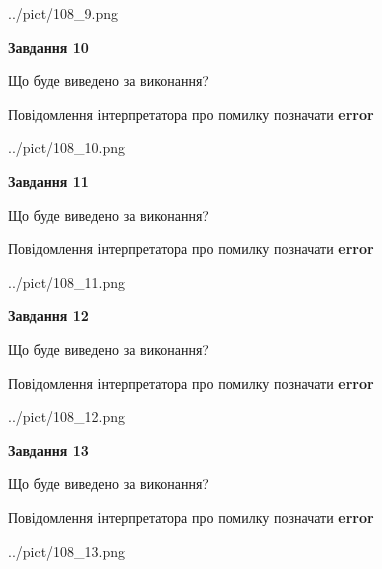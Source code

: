 \documentclass[11pt, ukrainian]{article}
\begin{document}
{\begin {large}
\begin{center}
	{../pict/108_9.png}
\end{center}
\newpage

{\begin {center}\textbf{Завдання 10}\end {center}}\par
Що буде виведено за виконання? \par
Повідомлення інтерпретатора про помилку позначати \textbf{error}

\begin{center}
	{../pict/108_10.png}
\end{center}
\newpage

{\begin {center}\textbf{Завдання 11}\end {center}}\par
Що буде виведено за виконання? \par
Повідомлення інтерпретатора про помилку позначати \textbf{error}

\begin{center}
	{../pict/108_11.png}
\end{center}
\newpage

{\begin {center}\textbf{Завдання 12}\end {center}}\par
Що буде виведено за виконання? \par
Повідомлення інтерпретатора про помилку позначати \textbf{error}

\begin{center}
	{../pict/108_12.png}
\end{center}
\newpage

{\begin {center}\textbf{Завдання 13}\end {center}}\par
Що буде виведено за виконання? \par
Повідомлення інтерпретатора про помилку позначати \textbf{error}

\begin{center}
	{../pict/108_13.png}
\end{center}
\newpage


\end{large}}
\end{document}
